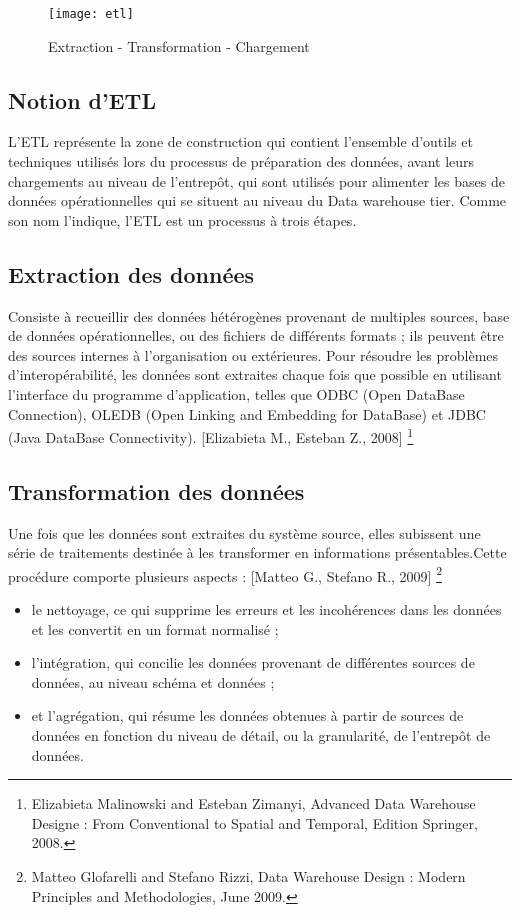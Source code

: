 \begin{figure}[H]
    \centering
    \texttt{[image: etl]}
    \caption{Extraction - Transformation - Chargement}
    \label{fig:etl}
\end{figure}

\subsection{Notion d’ETL}
L'ETL représente la zone de construction qui contient l’ensemble d’outils et techniques utilisés lors du processus de préparation des données, avant leurs chargements au niveau de l’entrepôt, qui sont utilisés pour alimenter les bases de données opérationnelles qui se situent au niveau du Data warehouse tier. Comme son nom l’indique, l’ETL est un processus à trois étapes.

\subsection{Extraction des données}
Consiste à recueillir des données hétérogènes provenant de multiples sources, base de données opérationnelles, ou des fichiers de différents formats ; ils peuvent être des sources internes à l’organisation ou extérieures. Pour résoudre les problèmes d’interopérabilité, les données sont extraites chaque fois que possible en utilisant l’interface du programme d’application, telles que ODBC (Open DataBase Connection), OLEDB (Open Linking and Embedding for DataBase) et JDBC (Java DataBase Connectivity). [Elizabieta M., Esteban Z., 2008] \footnote{Elizabieta Malinowski and Esteban Zimanyi, Advanced Data Warehouse Designe : From
Conventional to Spatial and Temporal, Edition Springer, 2008.}

\subsection{Transformation des données}
Une fois que les données sont extraites du système source, elles subissent une série de traitements destinée à les transformer en informations présentables.Cette procédure comporte plusieurs aspects : [Matteo G., Stefano R., 2009] \footnote{Matteo Glofarelli and Stefano Rizzi, Data Warehouse Design : Modern Principles and
Methodologies, June 2009.}
\begin{itemize}
    \item le nettoyage, ce qui supprime les erreurs et les incohérences dans les données et les convertit en un format normalisé ; 
    \item l’intégration, qui concilie les données provenant de différentes sources de données, au niveau schéma et données ; 
    \item et l’agrégation, qui résume les données obtenues à partir de sources de données en fonction du niveau de détail, ou la granularité, de l’entrepôt de données.
\end{itemize}

